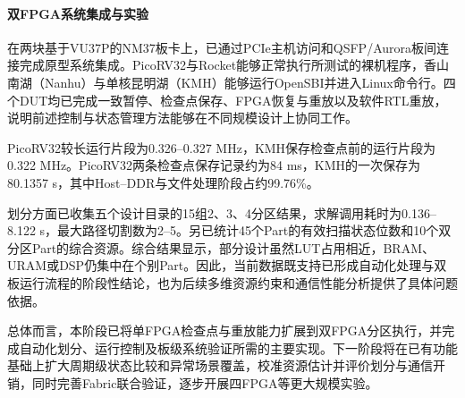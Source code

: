 \paragraph{双FPGA系统集成与实验}

在两块基于VU37P的NM37板卡上，已通过PCIe主机访问和QSFP/Aurora板间连接完成原型系统集成。PicoRV32与Rocket能够正常执行所测试的裸机程序，香山南湖（Nanhu）与单核昆明湖（KMH）能够运行OpenSBI并进入Linux命令行。四个DUT均已完成一致暂停、检查点保存、FPGA恢复与重放以及软件RTL重放，说明前述控制与状态管理方法能够在不同规模设计上协同工作。

PicoRV32较长运行片段为0.326--0.327 MHz，KMH保存检查点前的运行片段为0.322 MHz。PicoRV32两条检查点保存记录约为84 ms，KMH的一次保存为80.1357 s，其中Host--DDR与文件处理阶段占约99.76\%。

划分方面已收集五个设计目录的15组2、3、4分区结果，求解调用耗时为0.136--8.122 s，最大路径切割数为2--5。另已统计45个Part的有效扫描状态位数和10个双分区Part的综合资源。综合结果显示，部分设计虽然LUT占用相近，BRAM、URAM或DSP仍集中在个别Part。因此，当前数据既支持已形成自动化处理与双板运行流程的阶段性结论，也为后续多维资源约束和通信性能分析提供了具体问题依据。


总体而言，本阶段已将单FPGA检查点与重放能力扩展到双FPGA分区执行，并完成自动化划分、运行控制及板级系统验证所需的主要实现。下一阶段将在已有功能基础上扩大周期级状态比较和异常场景覆盖，校准资源估计并评价划分与通信开销，同时完善Fabric联合验证，逐步开展四FPGA等更大规模实验。
